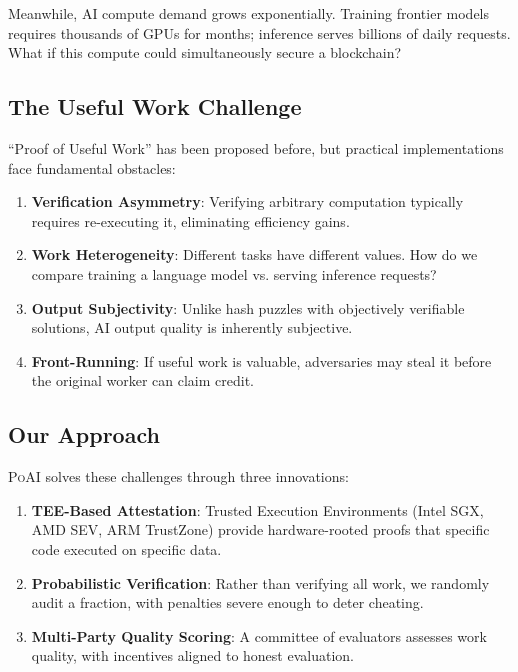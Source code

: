 \documentclass[11pt,letterpaper]{article}
\newcommand{\PoAI}{\textsc{PoAI}}
\begin{document}
Meanwhile, AI compute demand grows exponentially. Training frontier models requires thousands of GPUs for months; inference serves billions of daily requests. What if this compute could simultaneously secure a blockchain?

\subsection{The Useful Work Challenge}

``Proof of Useful Work'' has been proposed before, but practical implementations face fundamental obstacles:

\begin{enumerate}
    \item \textbf{Verification Asymmetry}: Verifying arbitrary computation typically requires re-executing it, eliminating efficiency gains.

    \item \textbf{Work Heterogeneity}: Different tasks have different values. How do we compare training a language model vs. serving inference requests?

    \item \textbf{Output Subjectivity}: Unlike hash puzzles with objectively verifiable solutions, AI output quality is inherently subjective.

    \item \textbf{Front-Running}: If useful work is valuable, adversaries may steal it before the original worker can claim credit.
\end{enumerate}

\subsection{Our Approach}

\PoAI{} solves these challenges through three innovations:

\begin{enumerate}
    \item \textbf{TEE-Based Attestation}: Trusted Execution Environments (Intel SGX, AMD SEV, ARM TrustZone) provide hardware-rooted proofs that specific code executed on specific data.

    \item \textbf{Probabilistic Verification}: Rather than verifying all work, we randomly audit a fraction, with penalties severe enough to deter cheating.

    \item \textbf{Multi-Party Quality Scoring}: A committee of evaluators assesses work quality, with incentives aligned to honest evaluation.
\end{enumerate}
\end{document}
